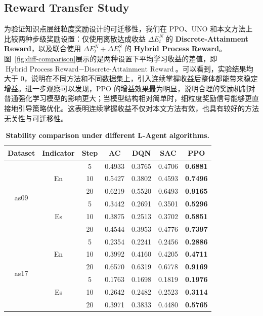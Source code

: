 \documentclass[11pt,a4paper]{article}
\begin{document}
\subsection{Reward Transfer Study}
为验证知识点层细粒度奖励设计的可迁移性，我们在 PPO、UNO 和本文方法上比较两种步级奖励设置：仅使用离散达成收益 $\Delta E_t^{N}$ 的 \textbf{Discrete-Attainment Reward}，以及联合使用 $\Delta E_t^{N}+\Delta E_t^{S}$ 的 \textbf{Hybrid Process Reward}。图~\ref{fig:diff-comparison}展示的是两种设置下平均学习收益的差值，即 $\text{Hybrid Process Reward} - \text{Discrete-Attainment Reward}$。可以看到，实验结果均大于 0，说明在不同方法和不同数据集上，引入连续掌握收益后整体都能带来稳定增益。进一步观察可以发现，PPO 的增益效果最为明显，说明合理的奖励机制对普通强化学习模型的影响更大；当模型结构相对简单时，细粒度奖励信号能够更直接地引导策略优化。这表明连续掌握收益不仅对本文方法有效，也具有较好的方法无关性与可迁移性。
\begin{table}[t]
\centering
\captionsetup{labelfont=bf,textfont=bf}
\caption{\textbf{Stability comparison under different L-Agent algorithms.}}
\label{tab:stability_analysis}
\setlength{\tabcolsep}{2.6pt}
\renewcommand{\arraystretch}{1.0}
\scriptsize
\begin{tabular}{ccccccc}
\toprule
\textbf{Dataset} & \textbf{Indicator} & \textbf{Step} & \textbf{AC} & \textbf{DQN} & \textbf{SAC} & \textbf{PPO} \\
\midrule
\multirow[c]{6}{}{as09} & \multirow[c]{3}{}{En} & 5 & 0.4933 & 0.3765 & 0.4706 & \textbf{0.6881} \\
& & 10 & 0.5427 & 0.3802 & 0.4593 & \textbf{0.7496} \\
& & 20 & 0.6219 & 0.5520 & 0.6493 & \textbf{0.9165} \\
\cmidrule(lr){2-7}
& \multirow[c]{3}{}{Es} & 5 & 0.3442 & 0.2691 & 0.3501 & \textbf{0.5296} \\
& & 10 & 0.3875 & 0.2513 & 0.3702 & \textbf{0.5851} \\
& & 20 & 0.4544 & 0.3953 & 0.4776 & \textbf{0.7397} \\
\midrule
\multirow[c]{6}{}{as17} & \multirow[c]{3}{}{En} & 5 & 0.2354 & 0.2241 & 0.2456 & \textbf{0.2886} \\
& & 10 & 0.3992 & 0.4160 & 0.4205 & \textbf{0.4711} \\
& & 20 & 0.6570 & 0.6319 & 0.6778 & \textbf{0.9169} \\
\cmidrule(lr){2-7}
& \multirow[c]{3}{}{Es} & 5 & 0.1763 & 0.1698 & 0.1819 & \textbf{0.1976} \\
& & 10 & 0.2642 & 0.2482 & 0.2523 & \textbf{0.3114} \\
& & 20 & 0.3971 & 0.3833 & 0.4480 & \textbf{0.5765} \\
\bottomrule
\end{tabular}
\end{table}
\end{document}

